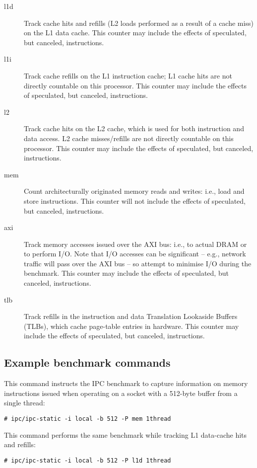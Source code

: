\documentclass[a4paper,10pt]{article}
\begin{document}
\begin{description}
\item[l1d] Track cache hits and refills (L2 loads performed as a result of a
  cache miss) on the L1 data cache.
  This counter may include the effects of speculated, but canceled,
  instructions.
\item[l1i] Track cache refills on the L1 instruction cache; L1 cache hits are
  not directly countable on this processor.
  This counter may include the effects of speculated, but canceled,
  instructions.
\item[l2] Track cache hits on the L2 cache, which is used for both
  instruction and data access.
  L2 cache misses/refills are not directly countable on this processor.
  This counter may include the effects of speculated, but canceled,
  instructions.
\item[mem] Count architecturally originated memory reads and writes: i.e.,
  load and store instructions.
  This counter will not include the effects of speculated, but canceled,
  instructions.
\item[axi] Track memory accesses issued over the AXI bus: i.e., to actual
  DRAM or to perform I/O.
  Note that I/O accesses can be significant -- e.g., network traffic will pass
  over the AXI bus -- so attempt to minimise I/O during the benchmark.
  This counter may include the effects of speculated, but canceled,
  instructions.
\item[tlb] Track refills in the instruction and data Translation Lookaside
  Buffers (TLBs), which cache page-table entries in hardware.
  This counter may include the effects of speculated, but canceled,
  instructions.
\end{description}

\subsection*{Example benchmark commands}

This command instructs the IPC benchmark to capture information on memory
instructions issued when operating on a socket with a 512-byte buffer from a
single thread:

\begin{verbatim}
# ipc/ipc-static -i local -b 512 -P mem 1thread
\end{verbatim}

\noindent
This command performs the same benchmark while tracking L1 data-cache hits and
refills:

\begin{verbatim}
# ipc/ipc-static -i local -b 512 -P l1d 1thread
\end{verbatim}
\end{document}
